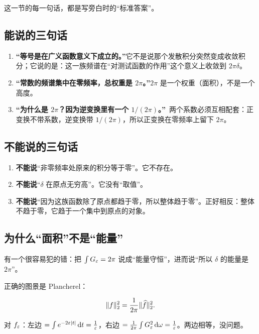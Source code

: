这一节的每一句话，都是写旁白时的“标准答案”。

\subsection{能说的三句话}

\begin{enumerate}[leftmargin=2em,itemsep=0.5em]
\item \textbf{“等号是在广义函数意义下成立的。”}它不是说那个发散积分突然变成收敛积分；它说的是：这一族频谱在“对测试函数的作用”这个意义上收敛到 $2\pi\delta$。
\item \textbf{“常数的频谱集中在零频率，总权重是 $2\pi$。”}$2\pi$ 是一个权重（面积），不是一个高度。
\item \textbf{“为什么是 $2\pi$？因为逆变换里有一个 $1/(2\pi)$。”}\ 两个系数必须互相配套：正变换不带系数，逆变换带 $1/(2\pi)$，所以正变换在零频率上留下 $2\pi$。
\end{enumerate}

\subsection{不能说的三句话}

\begin{warnbox}[EP01 的三条硬禁令]
\begin{enumerate}[leftmargin=1.4em,itemsep=0.35em]
\item \textbf{不能说}“非零频率处原来的积分等于零”。它不存在。
\item \textbf{不能说}“$\delta$ 在原点无穷高”。它没有“取值”。
\item \textbf{不能说}“因为这族函数除了原点都趋于零，所以整体趋于零”。正好相反：整体不趋于零，它趋于一个集中到原点的对象。
\end{enumerate}
\end{warnbox}

\subsection{为什么“面积”不是“能量”}

有一个很容易犯的错：把 $\int G_\varepsilon=2\pi$ 说成“能量守恒”，进而说“所以 $\delta$ 的能量是 $2\pi$”。

正确的图景是 Plancherel：

\begin{equation}
\|f\|_2^2=\frac{1}{2\pi}\|\widehat{f}\|_2^2 .
\end{equation}

对 $f_\varepsilon$：左边 $=\int e^{-2\varepsilon|t|}\mathop{}\!\mathrm{d} t=\frac{1}{\varepsilon}$，右边 $=\frac{1}{2\pi}\int G_\varepsilon^2\mathop{}\!\mathrm{d}\omega=\frac{1}{\varepsilon}$。两边相等，没问题。

